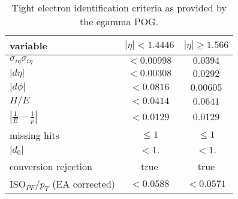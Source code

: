 \begin{table}[ht]
    \centering
    \setlength{\tabcolsep}{2em}
    \renewcommand{\arraystretch}{1.25}
    \caption{Tight electron identification criteria as provided by the egamma POG.}
    \label{tab:slt:electron_id}

    \begin{tabular}{l|c|c}
        variable                          & $|\eta| < 1.4446$ & $|\eta| \geq 1.566$ \\
        \hline
        $\sigma_{i\eta}\sigma_{i\eta}$    & $<0.00998$        & $0.0394$            \\
        $|d\eta|$                         & $<0.00308$        & $0.0292$            \\
        $|d\phi|$                         & $<0.0816$         & $0.00605$           \\
        $H/E$                             & $<0.0414$         & $0.0641$            \\
        $|\frac{1}{E} - \frac{1}{p}|$     & $<0.0129$         & $0.0129$            \\
        missing hits                      & $\leq 1$          & $\leq 1$            \\
        $|d_{0}|$                         & $<1.$             & $<1.$               \\
        \hline
        conversion rejection              & true              & true                \\
        ISO$_{PF}$/$p_{T}$ (EA corrected) & $< 0.0588$        & $<0.0571$           \\
    \end{tabular}
\end{table}